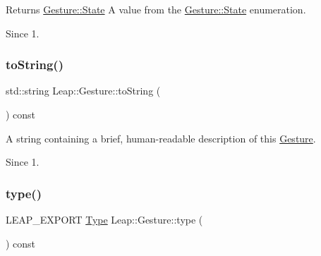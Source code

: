 \begin{DoxyCodeInclude}
\end{DoxyCodeInclude}


\begin{DoxyReturn}{Returns}
\hyperlink{class_leap_1_1_gesture_a068c6f3ba05970dc557b62a366073578}{Gesture\+::\+State} A value from the \hyperlink{class_leap_1_1_gesture_a068c6f3ba05970dc557b62a366073578}{Gesture\+::\+State} enumeration. 
\end{DoxyReturn}
\begin{DoxySince}{Since}
1. 
\end{DoxySince}
\mbox{\label{class_leap_1_1_gesture_a076e8d5632d6526acdc14daf6b3e6b2b}} 
\subsubsection{\texorpdfstring{to\+String()}{toString()}}
{\footnotesize\ttfamily std\+::string Leap\+::\+Gesture\+::to\+String (\begin{DoxyParamCaption}{ }\end{DoxyParamCaption}) const\hspace{0.3cm}{\ttfamily [inline]}}

A string containing a brief, human-\/readable description of this \hyperlink{class_leap_1_1_gesture}{Gesture}.


\begin{DoxyCodeInclude}
\end{DoxyCodeInclude}


\begin{DoxySince}{Since}
1. 
\end{DoxySince}
\mbox{\label{class_leap_1_1_gesture_a453d46397b104ad1d23887bd4ef715da}} 
\subsubsection{\texorpdfstring{type()}{type()}}
{\footnotesize\ttfamily L\+E\+A\+P\+\_\+\+E\+X\+P\+O\+RT \hyperlink{class_leap_1_1_gesture_a6fa6dd4f28c502f0d55abc6b71c6f9b1}{Type} Leap\+::\+Gesture\+::type (\begin{DoxyParamCaption}{ }\end{DoxyParamCaption}) const}

